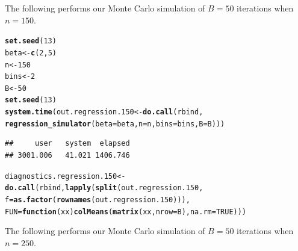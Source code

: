 \documentclass[11pt]{article}\usepackage[]{graphicx}\usepackage[]{color}
\makeatletter
\newcommand{\hlnum}[1]{\textcolor[rgb]{0.686,0.059,0.569}{#1}}%
\newcommand{\hlstd}[1]{\textcolor[rgb]{0.345,0.345,0.345}{#1}}%
\newcommand{\hlkwa}[1]{\textcolor[rgb]{0.161,0.373,0.58}{\textbf{#1}}}%
\newcommand{\hlkwb}[1]{\textcolor[rgb]{0.69,0.353,0.396}{#1}}%
\newcommand{\hlkwc}[1]{\textcolor[rgb]{0.333,0.667,0.333}{#1}}%
\newcommand{\hlkwd}[1]{\textcolor[rgb]{0.737,0.353,0.396}{\textbf{#1}}}%
\newenvironment{kframe}{%
 \def\at@end@of@kframe{}%
 \ifinner\ifhmode%
  \def\at@end@of@kframe{\end{minipage}}%
  \begin{minipage}{\columnwidth}%
 \fi\fi%
 \def\FrameCommand##1{\hskip\@totalleftmargin \hskip-\fboxsep
 \colorbox{shadecolor}{##1}\hskip-\fboxsep
     \hskip-\linewidth \hskip-\@totalleftmargin \hskip\columnwidth}%
 \MakeFramed {\advance\hsize-\width
   \@totalleftmargin\z@ \linewidth\hsize
   \@setminipage}}%
 {\par\unskip\endMakeFramed%
 \at@end@of@kframe}
\newenvironment{knitrout}{}{} %
\makeatother
\begin{document}
The following performs our Monte Carlo simulation of $B = 50$ iterations 
when $n = 150$.


\begin{knitrout}
\color{fgcolor}\begin{kframe}
\begin{alltt}
\hlkwd{set.seed}\hlstd{(}\hlnum{13}\hlstd{)}
\hlstd{beta} \hlkwb{<-} \hlkwd{c}\hlstd{(}\hlnum{2}\hlstd{,} \hlnum{5}\hlstd{)}
\hlstd{n} \hlkwb{<-} \hlnum{150}
\hlstd{bins} \hlkwb{<-} \hlnum{2}
\hlstd{B} \hlkwb{<-} \hlnum{50}
\hlkwd{set.seed}\hlstd{(}\hlnum{13}\hlstd{)}
\hlkwd{system.time}\hlstd{(out.regression.150} \hlkwb{<-} \hlkwd{do.call}\hlstd{(rbind,}
  \hlkwd{regression_simulator}\hlstd{(}\hlkwc{beta} \hlstd{= beta,} \hlkwc{n} \hlstd{= n,} \hlkwc{bins} \hlstd{= bins,} \hlkwc{B} \hlstd{= B)))}
\end{alltt}
\begin{verbatim}
##     user   system  elapsed 
## 3001.006   41.021 1406.746
\end{verbatim}
\begin{alltt}
\hlstd{diagnostics.regression.150} \hlkwb{<-} \hlkwd{do.call}\hlstd{(rbind,} \hlkwd{lapply}\hlstd{(}\hlkwd{split}\hlstd{(out.regression.150,}
  \hlkwc{f} \hlstd{=} \hlkwd{as.factor}\hlstd{(}\hlkwd{rownames}\hlstd{(out.regression.150))),}
  \hlkwc{FUN} \hlstd{=} \hlkwa{function}\hlstd{(}\hlkwc{xx}\hlstd{)} \hlkwd{colMeans}\hlstd{(}\hlkwd{matrix}\hlstd{(xx,} \hlkwc{nrow} \hlstd{= B),} \hlkwc{na.rm} \hlstd{=} \hlnum{TRUE}\hlstd{)))}
\end{alltt}
\end{kframe}
\end{knitrout}


The following performs our Monte Carlo simulation of $B = 50$ iterations 
when $n = 250$.
\end{document}
